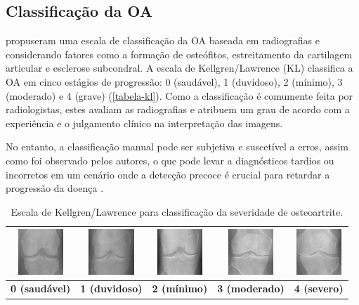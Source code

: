 \subsection{Classificação da OA}

 propuseram uma escala de classificação da OA baseada em radiografias e considerando fatores como a formação de osteófitos, estreitamento da cartilagem articular e esclerose subcondral. A escala de Kellgren/Lawrence (KL) classifica a OA em cinco estágios de progressão: 0 (saudável), 1 (duvidoso), 2 (mínimo), 3 (moderado) e 4 (grave) (\autoref{tabela-kl}). Como a classificação é comumente feita por radiologistas, estes avaliam as radiografias e atribuem um grau de acordo com a experiência e o julgamento clínico na interpretação das imagens.

No entanto, a classificação manual pode ser subjetiva e suscetível a erros, assim como foi observado pelos autores, o que pode levar a diagnósticos tardios ou incorretos em um cenário onde a detecção precoce é crucial para retardar a progressão da doença .

\begin{table}[h]
    \centering
    \begin{tabular}{|c|c|c|c|c|}
        \hline
        \includegraphics[width=1.7cm]{figs/KL0-sample.png} & \includegraphics[width=1.7cm]{figs/KL1-sample.png} & \includegraphics[width=1.7cm]{figs/KL2-sample.png} & \includegraphics[width=1.7cm]{figs/KL3-sample.png} & \includegraphics[width=1.7cm]{figs/KL4-sample.png} \\
        \hline
        \textbf{0 (saudável)} & \textbf{1 (duvidoso)} & \textbf{2 (mínimo)} & \textbf{3 (moderado)} & \textbf{4 (severo)} \\
        \hline
    \end{tabular}
    \caption{Escala de Kellgren/Lawrence para classificação da severidade de osteoartrite.}
    \label{tabela-kl}
\end{table}

